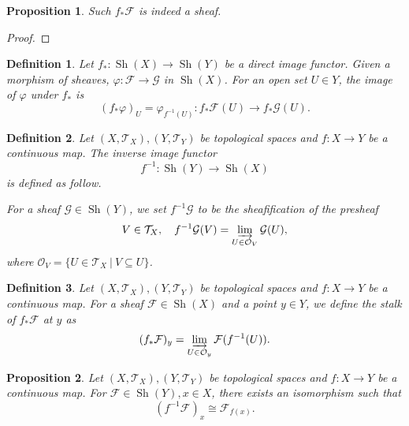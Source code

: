 \documentclass{article}
\newtheorem{proposition}{Proposition}[section]
\newtheorem{definition}{Definition}[section]
\numberwithin{equation}{section}
\DeclareMathOperator{\Sh}{Sh}
\begin{document}
\begin{proposition}
Such $f_*\mathcal{F}$ is indeed a sheaf.
\end{proposition}

\begin{proof}
\end{proof}

\begin{definition}
Let $f_*:\Sh(X)\to\Sh(Y)$ be a direct image functor. Given a morphism of sheaves, $\varphi:\mathcal{F}\to\mathcal{G}$ in $\Sh(X)$. For an open set $U\in Y$, the image of $\varphi$ under $f_*$ is 
\begin{equation*}
(f_*\varphi)_U = \varphi_{f^{-1}(U)}:f_*\mathcal{F}(U)\to f_*\mathcal{G}(U).
\end{equation*}
\end{definition}

\begin{definition}
Let $(X,\mathcal{T}_X),(Y,\mathcal{T}_Y)$ be topological spaces and $f:X\to Y$ be a continuous map. The inverse image functor 
\begin{equation*}
f^{-1}:\Sh(Y)\to\Sh(X)
\end{equation*}
is defined as follow.\\
\par For a sheaf $\mathcal{G}\in\Sh(Y)$, we set $f^{-1}\mathcal{G}$ to be the sheafification of the presheaf
\begin{equation*}
V\in\mathcal{T}_X,\quad f^{-1}\mathcal{G}(V) = \varinjlim_{U\in\mathcal{O}_V}\mathcal{G}(U),
\end{equation*}
where $\mathcal{O}_V = \{U\in\mathcal{T}_X\:|\: V\subseteq U\}$.
\end{definition}

\begin{definition}
Let $(X,\mathcal{T}_X),(Y,\mathcal{T}_Y)$ be topological spaces and $f:X\to Y$ be a continuous map. For a sheaf $\mathcal{F}\in\Sh(X)$ and a point $y\in Y$, we define the stalk of $f_*\mathcal{F}$ at $y$ as
\begin{equation*}
(f_*\mathcal{F})_y = \varinjlim_{U\in\mathcal{O}_y}\mathcal{F}(f^{-1}(U)).
\end{equation*}
\end{definition}

\begin{proposition}
Let $(X,\mathcal{T}_X),(Y,\mathcal{T}_Y)$ be topological spaces and $f:X\to Y$ be a continuous map. For $\mathcal{F}\in\Sh(Y),x\in X$, there exists an isomorphism such that 
\begin{equation*}
(f^{-1}\mathcal{F})_x \cong \mathcal{F}_{f(x)}.
\end{equation*}
\end{proposition}
\end{document}
